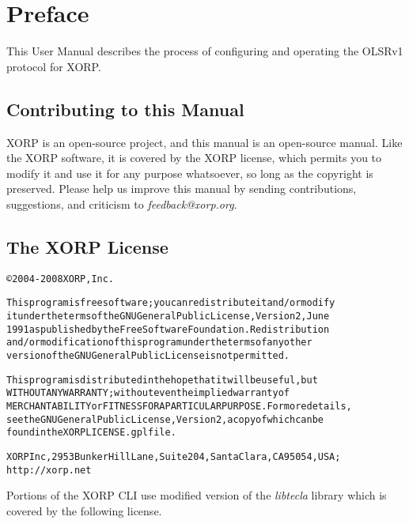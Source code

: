 %
%

\chapter*{Preface}

\vspace{-0.1in}
This User Manual describes the process of configuring and operating
the OLSRv1 protocol for XORP.

\section*{Contributing to this Manual}
\vspace{-0.1in}
XORP is an open-source project, and this manual is an open-source
manual.  Like the XORP software, it is covered by the XORP license,
which permits you to modify it and use it for any purpose whatsoever,
so long as the copyright is preserved.  Please help us improve this
manual by sending contributions, suggestions, and criticism to {\it
  feedback@xorp.org}.

\section*{The XORP License}
\vspace{-0.3in}
\begin{alltt}
\small\noindent
\copyright 2004-2008 XORP, Inc.

This program is free software; you can redistribute it and/or modify
it under the terms of the GNU General Public License, Version 2, June
1991 as published by the Free Software Foundation. Redistribution
and/or modification of this program under the terms of any other
version of the GNU General Public License is not permitted.

This program is distributed in the hope that it will be useful, but
WITHOUT ANY WARRANTY; without even the implied warranty of
MERCHANTABILITY or FITNESS FOR A PARTICULAR PURPOSE. For more details,
see the GNU General Public License, Version 2, a copy of which can be
found in the XORP LICENSE.gpl file.

XORP Inc, 2953 Bunker Hill Lane, Suite 204, Santa Clara, CA 95054, USA;
http://xorp.net
\end{alltt}

Portions of the XORP CLI use modified version of the {\it libtecla}
library which is covered by the following license.

